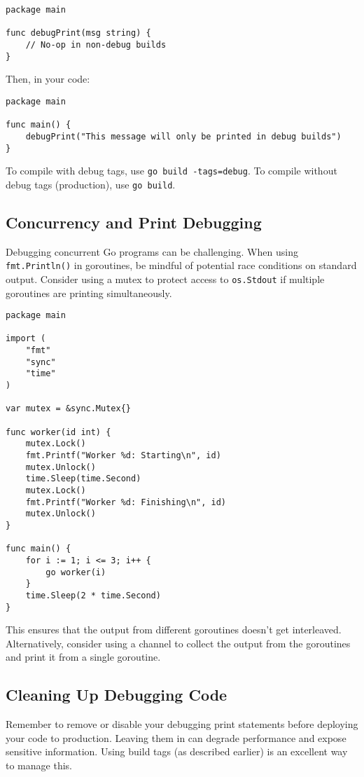 \documentclass{article}
\begin{document}
{{{{\begin{verbatim}
package main

func debugPrint(msg string) {
    // No-op in non-debug builds
}
\end{verbatim}

Then, in your code:

\begin{verbatim}
package main

func main() {
    debugPrint("This message will only be printed in debug builds")
}
\end{verbatim}

To compile with debug tags, use \texttt{go build -tags=debug}.  To compile without debug tags (production), use \texttt{go build}.

\subsection*{Concurrency and Print Debugging}

Debugging concurrent Go programs can be challenging.  When using \texttt{fmt.Println()} in goroutines, be mindful of potential race conditions on standard output. Consider using a mutex to protect access to \texttt{os.Stdout} if multiple goroutines are printing simultaneously.

\begin{verbatim}
package main

import (
    "fmt"
    "sync"
    "time"
)

var mutex = &sync.Mutex{}

func worker(id int) {
    mutex.Lock()
    fmt.Printf("Worker %d: Starting\n", id)
    mutex.Unlock()
    time.Sleep(time.Second)
    mutex.Lock()
    fmt.Printf("Worker %d: Finishing\n", id)
    mutex.Unlock()
}

func main() {
    for i := 1; i <= 3; i++ {
        go worker(i)
    }
    time.Sleep(2 * time.Second)
}
\end{verbatim}

This ensures that the output from different goroutines doesn't get interleaved. Alternatively, consider using a channel to collect the output from the goroutines and print it from a single goroutine.

\subsection*{Cleaning Up Debugging Code}

Remember to remove or disable your debugging print statements before deploying your code to production. Leaving them in can degrade performance and expose sensitive information.  Using build tags (as described earlier) is an excellent way to manage this.

}}}}
\end{document}
